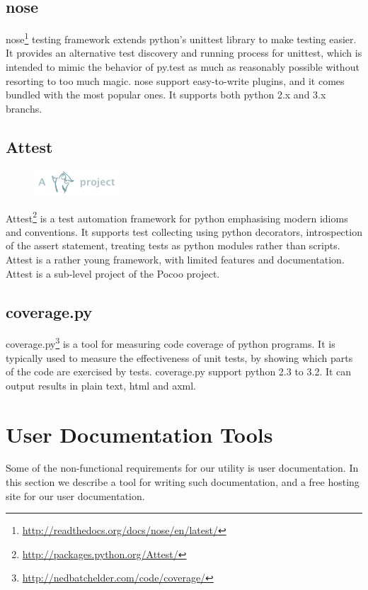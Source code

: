 \subsection{nose}
nose\footnote{\url{http://readthedocs.org/docs/nose/en/latest/}} testing
framework extends \Gls{python}'s unittest \gls{library} to make testing easier.
It provides an alternative test discovery and running process for unittest,
which is intended to mimic the behavior of py.test as much as reasonably
possible without resorting to too much magic. nose support easy-to-write
plugins, and it comes bundled with the most popular ones. It supports both
\Gls{python} 2.x and 3.x \glspl{branch}.

\subsection{Attest}
\label{sec:pre:attest}
\begin{figure}
	\vspace{-20pt}
	\includegraphics[width=3.2cm]{./planning/img/pocoo_logo}
	\vspace{-30pt}
\end{figure}
Attest\footnote{\url{http://packages.python.org/Attest/}} is a test automation
framework for \Gls{python} emphasising modern idioms and conventions. It supports
test collecting using \Gls{python} decorators, introspection of the assert statement,
treating tests as \Gls{python} modules rather than scripts. Attest is a rather young
framework, with limited features and documentation. Attest is a sub-level
project of the Pocoo project.

\subsection{coverage.py}
coverage.py\footnote{\url{http://nedbatchelder.com/code/coverage/}} is a tool
for measuring code coverage of \Gls{python} programs. It is typically used to measure
the effectiveness of unit tests, by showing which parts of the code are
exercised by tests. coverage.py support \Gls{python} 2.3 to 3.2. It can output
results in plain text, \Gls{html} and \Gls{axml}.


\section{User Documentation Tools}
\label{sec:pre:docs}
Some of the non-functional requirements for our \gls{utility} is user documentation.
In this section we describe a tool for writing such documentation, and a free
hosting site for our user documentation.

